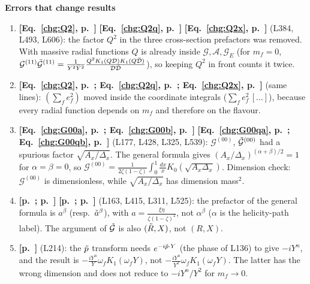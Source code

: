 \documentclass[9pt]{article}
\numberwithin{equation}{section}
\begin{document}
\noindent\textbf{Errors that change results}
\begin{enumerate}
    \item \textbf{[Eq.~\eqref{chg:Q2}, p.~\pageref{chg:Q2}]} \textbf{[Eq.~\eqref{chg:Q2q}, p.~\pageref{chg:Q2q}]} \textbf{[Eq.~\eqref{chg:Q2x}, p.~\pageref{chg:Q2x}]} (L384, L493, L606): the factor $Q^{2}$ in the three cross-section prefactors was removed. With massive radial functions $Q$ is already inside $\mathcal{G},\mathcal{A},\mathcal{G}_{E}$ (for $m_{f}=0$, $\mathcal{G}^{(11)}\Bar{\mathcal{G}}^{(11)} = \frac{1}{Y^{2}\Bar{Y}^{2}}\frac{Q^{2}K_{1}(Q\mathcal{D})K_{1}(Q\Bar{\mathcal{D}})}{\mathcal{D}\Bar{\mathcal{D}}}$), so keeping $Q^{2}$ in front counts it twice.
    \item \textbf{[Eq.~\eqref{chg:Q2}, p.~\pageref{chg:Q2}; Eq.~\eqref{chg:Q2q}, p.~\pageref{chg:Q2q}; Eq.~\eqref{chg:Q2x}, p.~\pageref{chg:Q2x}]} (same lines): $\left(\sum_{f}e^{2}_{f}\right)$ moved inside the coordinate integrals ($\sum_{f}e^{2}_{f}\,[\ldots]$), because every radial function depends on $m_{f}$ and therefore on the flavour.
    \item \textbf{[Eq.~\eqref{chg:G00a}, p.~\pageref{chg:G00a}; Eq.~\eqref{chg:G00b}, p.~\pageref{chg:G00b}]} \textbf{[Eq.~\eqref{chg:G00qa}, p.~\pageref{chg:G00qa}; Eq.~\eqref{chg:G00qb}, p.~\pageref{chg:G00qb}]} (L177, L428, L325, L539): $\mathcal{G}^{(00)}$, $\Tilde{\mathcal{G}}^{(00)}$ had a spurious factor $\sqrt{A_{x}/\Delta_{x}}$. The general formula gives $(A_{x}/\Delta_{x})^{(\alpha+\beta)/2}=1$ for $\alpha=\beta=0$, so $\mathcal{G}^{(00)}=\frac{1}{2\zeta(1-\zeta)}\int_{0}^{1}\frac{dx}{x}K_{0}(\sqrt{A_{x}\Delta_{x}})$. Dimension check: $\mathcal{G}^{(00)}$ is dimensionless, while $\sqrt{A_{x}/\Delta_{x}}$ has dimension mass$^{2}$.
    \item \textbf{[p.~\pageref{chg:abetaa}; p.~\pageref{chg:abetab}]} \textbf{[p.~\pageref{chg:abetaqa}; p.~\pageref{chg:abetaqb}]} (L163, L415, L311, L525): the prefactor of the general formula is $a^{\beta}$ (resp.\ $\Tilde{a}^{\beta}$), with $a=\frac{\xi\eta}{\zeta(1-\zeta)^{2}}$, not $\alpha^{\beta}$ ($\alpha$ is the helicity-path label). The argument of $\Tilde{\mathcal{G}}$ is also $(\Tilde{R},X)$, not $(R,X)$.
    \item \textbf{[p.~\pageref{chg:pFT}]} (L214): the $\Tilde{p}$ transform needs $e^{-i\Tilde{p}\cdot Y}$ (the phase of L136) to give $-iY^{n}$, and the result is $-\frac{iY^{n}}{Y}\omega_{f}K_{1}(\omega_{f}Y)$, not $-\frac{iY^{n}}{Y^{2}}\omega_{f}K_{1}(\omega_{f}Y)$. The latter has the wrong dimension and does not reduce to $-iY^{n}/Y^{2}$ for $m_{f}\rightarrow 0$.

\end{enumerate}
\end{document}

